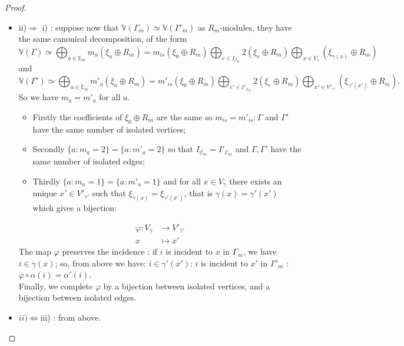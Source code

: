 \documentclass[10pt,a4paper]{amsart}
\begin{document}
\begin{proof}
\begin{itemize}
\item[-] ii)$\Longrightarrow$ i) : suppose now that  $\mathbb{V}(\Gamma_m) \simeq \mathbb{V}(\Gamma'_m)$ as $R_m$-modules, they have the same canonical decomposition, of the form 
$$\mathbb{V}(\Gamma)\simeq \bigoplus_{a \in \mathbb{E}_m}m_a (\xi_a\oplus R_m)=
 m_{is} \left(\xi_{0}\oplus R_m\right)\bigoplus_{e\in I_{\mathcal{E}_m}} 2 \left(\xi_{e}\oplus R_m\right) \bigoplus_{x \in V_{\gamma}} \left(\xi_{\gamma(x)}\oplus R_m\right)$$
and
$$\mathbb{V}(\Gamma')\simeq \bigoplus_{a \in \mathbb{E}_m}m'_a (\xi_a\oplus R_m)=
 m'_{is} \left(\xi_{0}\oplus R_m\right)\bigoplus_{e'\in I'_{\mathcal{E}_m}} 2 \left(\xi_{e}\oplus R_m\right) \bigoplus_{x' \in V'_{\gamma'}} \left(\xi_{\gamma'(x')}\oplus R_m\right).$$
So we have $m_a=m'_a$ for all $a$.
\begin{itemize}
\item[-] Firstly the coefficients of $\xi_0 \oplus R_m$ are the same so $m_{is}=m'_{is}: \Gamma$ and $\Gamma'$ have the same number of isolated vertices;
\item[-] Secondly $\{a: m_a=2\}=\{ a: m'_a=2\}$ so that $ I_{\mathcal{E}_m}= I'_{\mathcal{E}_m}$ and  $\Gamma, \Gamma'$ have the same number of isolated edges;
\item[-] Thirdly $\{a: m_a=1\}=\{ a: m'_a=1\}$ and for all  $x \in V_{\gamma}$ there exists an  unique $x' \in
 V'_{\gamma'}$ such that $\xi_{\gamma(x)}=\xi_{\gamma'(x')}$, that is $\gamma(x)
 =\gamma'(x')$ which   gives a bijection: 
\end{itemize}
 \begin{eqnarray*} 
 \varphi  : V_{\gamma}& \longrightarrow V'_{\gamma'}\\
                               x    & \longmapsto x'
\end{eqnarray*}
The map $\varphi$ preserves the  incidence : if $i$ is  incident to $x$ in $\Gamma_m$, we have $i \in
\gamma(x)$; so, from above  we have: $i \in \gamma'(x')$: $i$ is incident to $x'$ in $\Gamma'_m$ : $\varphi\circ\alpha(i)=\alpha'(i)$.\\

\noindent Finally, we complete $\varphi$ by a bijection between isolated vertices, and a bijection between isolated edges.
\item[-] $ii)\Longleftrightarrow $iii) : from above. \qedhere
\end{itemize}
\end{proof}
\end{document}
